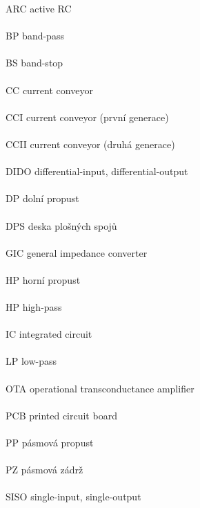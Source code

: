 ARC \hfill active RC \\ \\
BP \hfill band-pass \\ \\
BS \hfill band-stop \\ \\
CC \hfill current conveyor \\ \\
CCI \hfill current conveyor (první generace) \\ \\
CCII \hfill current conveyor (druhá generace) \\ \\
DIDO \hfill differential-input, differential-output \\ \\
DP \hfill dolní propust \\ \\
DPS \hfill deska plošných spojů \\ \\
GIC \hfill general impedance converter \\ \\
HP \hfill horní propust \\ \\
HP \hfill high-pass \\ \\
IC \hfill integrated circuit \\ \\
LP \hfill low-pass \\ \\
OTA \hfill operational transconductance amplifier \\ \\
PCB \hfill printed circuit board \\ \\
PP \hfill pásmová propust \\ \\
PZ \hfill pásmová zádrž \\ \\
SISO \hfill single-input, single-output \\ \\
